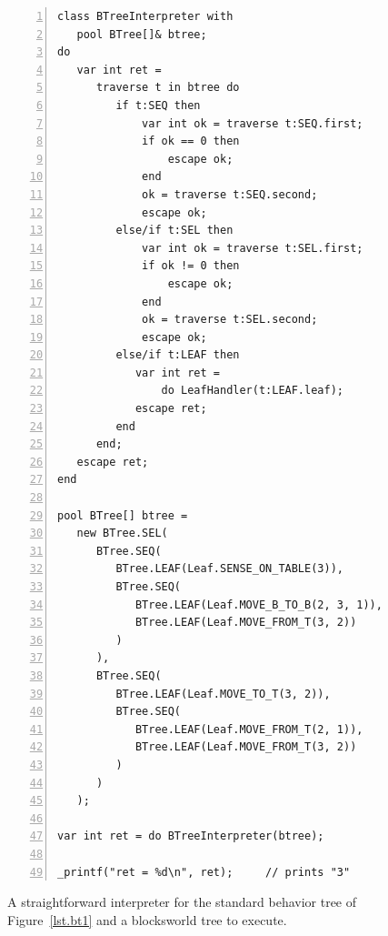 \documentclass{acm_proc_article-sp}
\begin{document}
\begin{figure}%
\begin{lstlisting}[numbers=left,xleftmargin=3em]
class BTreeInterpreter with
   pool BTree[]& btree;
do
   var int ret =
      traverse t in btree do
         if t:SEQ then
             var int ok = traverse t:SEQ.first;
             if ok == 0 then
                 escape ok;
             end
             ok = traverse t:SEQ.second;
             escape ok;
         else/if t:SEL then
             var int ok = traverse t:SEL.first;
             if ok != 0 then
                 escape ok;
             end
             ok = traverse t:SEL.second;
             escape ok;
         else/if t:LEAF then
            var int ret =
                do LeafHandler(t:LEAF.leaf);
            escape ret;
         end
      end;
   escape ret;
end

pool BTree[] btree =
   new BTree.SEL(
      BTree.SEQ(
         BTree.LEAF(Leaf.SENSE_ON_TABLE(3)),
         BTree.SEQ(
            BTree.LEAF(Leaf.MOVE_B_TO_B(2, 3, 1)),
            BTree.LEAF(Leaf.MOVE_FROM_T(3, 2))
         )
      ),
      BTree.SEQ(
         BTree.LEAF(Leaf.MOVE_TO_T(3, 2)),
         BTree.SEQ(
            BTree.LEAF(Leaf.MOVE_FROM_T(2, 1)),
            BTree.LEAF(Leaf.MOVE_FROM_T(3, 2))
         )
      )
   );

var int ret = do BTreeInterpreter(btree);

_printf("ret = %d\n", ret);     // prints "3"
\end{lstlisting}
\caption{ A straightforward interpreter for the standard behavior tree of 
          Figure~\ref{lst.bt1} and a blocksworld tree to execute.
\label{lst.bt1.interpreter}
}
\end{figure}


\end{document}
